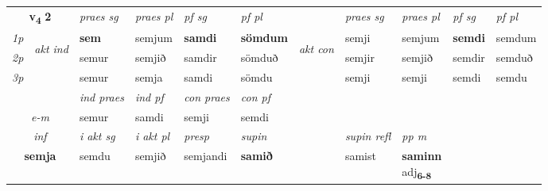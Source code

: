 \noindent
\begin{tabular}{lllllllllll} \toprule
\multicolumn{2}{c}{\textbf{v{\textsubscript{4}}} \Large{\textbf{2}}}  &  \textit{praes sg}  & \textit{praes pl}  &\textit{ pf sg} & \textit{pf pl} &  &  \textit{praes sg}  & \textit{praes pl}  & \textit{pf sg} & \textit{pf pl } \\*
	\cmidrule{3-6} \cmidrule{8-11}
 {\textit{1p}} & \multirow{3}{*}{\begin{turn}{90}\textit{akt ind}\end{turn}} & \textbf{sem} & semjum & \textbf{samdi} & \textbf{sömdum} & \multirow{3}{*}{\begin{turn}{90}\textit{akt con}\end{turn}} &semji & semjum & \textbf{semdi} & semdum\\*
 {\textit{2p}} &  &  semur  & semjið & samdir & sömduð & & semjir & semjið & semdir & semduð \\*
{\textit{3p}} &  & semur & semja & samdi & sömdu & & semji & semji& semdi & semdu \\*
\cmidrule{3-6} \cmidrule{8-11}

   & &  \textit{ind praes} & \textit{ind pf} & \textit{con praes} & \textit{con pf} \\*
\multicolumn{2}{c}{ \textit{e-m} } & semur & samdi & semji & semdi \\*

\cmidrule{3-9}
   \multicolumn{2}{c}{\textit{inf}}  & \textit{i akt sg} & \textit{i akt pl}   & \textit{presp} & \textit{supin} && \textit{supin refl} & \textit{pp m} \\*
  \multicolumn{2}{c}{\textbf{semja}} & semdu  & semjið   & semjandi &  \textbf{samið} && samist & \specialcell{\textbf{saminn} \\ adj\textbf{\textsubscript{6-8}}} \\*
\end{tabular}

